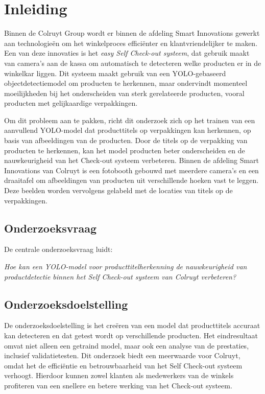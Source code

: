 \section{Inleiding}%
\label{sec:inleiding}

Binnen de Colruyt Group wordt er binnen de afdeling Smart Innovations gewerkt aan technologieën om het winkelproces efficiënter en klantvriendelijker te maken. Een van deze innovaties is het \textit{easy Self Check-out systeem}, dat gebruik maakt van camera’s aan de kassa om automatisch te detecteren welke producten er in de winkelkar liggen. Dit systeem maakt gebruik van een YOLO-gebaseerd objectdetectiemodel om producten te herkennen, maar ondervindt momenteel moeilijkheden bij het onderscheiden van sterk gerelateerde producten, vooral producten met gelijkaardige verpakkingen.

Om dit probleem aan te pakken, richt dit onderzoek zich op het trainen van een aanvullend YOLO-model dat producttitels op verpakkingen kan herkennen, op basis van afbeeldingen van de producten. Door de titels op de verpakking van producten te herkennen, kan het model producten beter onderscheiden en de nauwkeurigheid van het Check-out systeem verbeteren. Binnen de afdeling Smart Innovations van Colruyt is een fotobooth gebouwd met meerdere camera’s en een draaitafel om afbeeldingen van producten uit verschillende hoeken vast te leggen. Deze beelden worden vervolgens gelabeld met de locaties van titels op de verpakkingen.

\subsection*{Onderzoeksvraag}
De centrale onderzoeksvraag luidt:

\begin{center}
    \textit{Hoe kan een YOLO-model voor producttitelherkenning de nauwkeurigheid van productdetectie binnen het Self Check-out systeem van Colruyt verbeteren?}
\end{center}

\subsection*{Onderzoeksdoelstelling}
De onderzoeksdoelstelling is het creëren van een model dat producttitels accuraat kan detecteren en dat getest wordt op verschillende producten. Het eindresultaat omvat niet alleen een getraind model, maar ook een analyse van de prestaties, inclusief validatietesten. Dit onderzoek biedt een meerwaarde voor Colruyt, omdat het de efficiëntie en betrouwbaarheid van het Self Check-out systeem verhoogt. Hierdoor kunnen zowel klanten als medewerkers van de winkels profiteren van een snellere en betere werking van het Check-out systeem.

